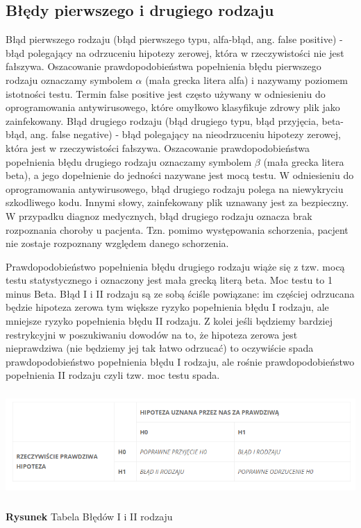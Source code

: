 \documentclass{classrep}
\begin{document}
\subsection{Błędy pierwszego i drugiego rodzaju}
Błąd pierwszego rodzaju (błąd pierwszego typu, alfa-błąd, ang. false positive) - błąd polegający na odrzuceniu hipotezy zerowej, która w rzeczywistości nie jest fałszywa. Oszacowanie prawdopodobieństwa popełnienia błędu pierwszego rodzaju oznaczamy symbolem $\alpha$ (mała grecka litera alfa) i nazywamy poziomem istotności testu. Termin false positive jest często używany w odniesieniu do oprogramowania antywirusowego, które omyłkowo klasyfikuje zdrowy plik jako zainfekowany.
Błąd drugiego rodzaju (błąd drugiego typu, błąd przyjęcia, beta-błąd, ang. false negative) - błąd polegający na nieodrzuceniu hipotezy zerowej, która jest w rzeczywistości fałszywa.
Oszacowanie prawdopodobieństwa popełnienia błędu drugiego rodzaju oznaczamy symbolem $\beta$ (mała grecka litera beta), a jego dopełnienie do jedności nazywane jest mocą testu. W odniesieniu do oprogramowania antywirusowego, błąd drugiego rodzaju polega na niewykryciu szkodliwego kodu. Innymi słowy, zainfekowany plik uznawany jest za bezpieczny. W przypadku diagnoz medycznych, błąd drugiego rodzaju oznacza brak rozpoznania choroby u pacjenta. Tzn. pomimo występowania schorzenia, pacjent nie zostaje rozpoznany względem danego schorzenia.


Prawdopodobieństwo popełnienia błędu drugiego rodzaju wiąże się z tzw. mocą testu statystycznego i oznaczony jest mała grecką literą beta. Moc testu to 1 minus Beta. Błąd I i II rodzaju są ze sobą ściśle powiązane: im częściej odrzucana będzie hipoteza zerowa tym większe ryzyko popełnienia błędu I rodzaju, ale mniejsze ryzyko popełnienia błędu II rodzaju. Z kolei jeśli będziemy bardziej restrykcyjni w poszukiwaniu dowodów na to, że hipoteza zerowa jest nieprawdziwa (nie będziemy jej tak łatwo odrzucać) to oczywiście spada prawdopodobieństwo popełnienia błędu I rodzaju, ale rośnie prawdopodobieństwo popełnienia II rodzaju czyli tzw. moc testu spada.

\begin{center}
	\includegraphics[height=4cm]{bledy.png}
	
	\textbf{Rysunek} \citep{wikipedia} Tabela Błędów I i II rodzaju
\end{center}
\end{document}
